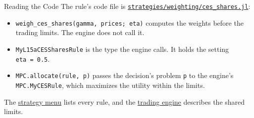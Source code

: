 \documentclass[aspectratio=169,11pt]{beamer}
\newcommand{\repo}{https://github.com/varnerlab/CHEME-5660-CourseRepository-Fall-2026/blob/main/lectures/week-15/L15a}
\begin{document}
\begin{frame}{Reading the Code}
  \vspace{0.3em}
  The rule's code file is
  \href{\repo/strategies/weighting/ces_shares.jl}{\texttt{strategies/weighting/ces\_shares.jl}}:
  \begin{itemize}\setlength{\itemsep}{0.5em}
    \item \texttt{weigh\_ces\_shares(gamma, prices; eta)} computes the weights before the trading limits. The engine does not call it.
    \item \texttt{MyL15aCESSharesRule} is the type the engine calls. It holds the setting \texttt{eta~=~0.5}.
    \item \texttt{MPC.allocate(rule, p)} passes the decision's problem \texttt{p} to the engine's \texttt{MPC.MyCESRule}, which maximizes the utility within the limits.
  \end{itemize}

  \vspace{0.5em}
  The \href{\repo/strategies/CHEME-5660-L15a-Strategy-Menu-Fall-2026.ipynb}{strategy menu} lists every rule, and the \href{\repo/engine/CHEME-5660-L15a-Trading-Engine-Fall-2026.ipynb}{trading engine} describes the shared limits.
\end{frame}
\end{document}
